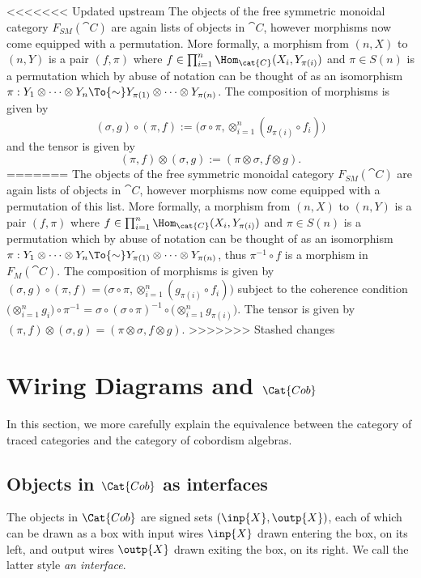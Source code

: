 <<<<<<< Updated upstream
The objects of the free symmetric monoidal category $F_{SM}(\cat{C})$ are again lists of objects in $\cat{C}$, however morphisms now come equipped with a permutation.  More formally, a morphism from $(n,X)$ to $(n,Y)$ is a pair $(f,\pi)$ where $f\in\prod_{i=1}^n\Hom_{\cat{C}}(X_i,Y_{\pi(i)})$ and $\pi\in S(n)$ is a permutation which by abuse of notation can be thought of as an isomorphism $\pi:Y_1\otimes\cdots\otimes Y_n\To{\sim} Y_{\pi(1)}\otimes\cdots\otimes Y_{\pi(n)}$.  The composition of morphisms is given by 
$$(\sigma,g)\circ(\pi,f):=\Big(\sigma\circ\pi,\otimes_{i=1}^n (g_{\pi(i)}\circ f_i)\Big)$$ 
and the tensor is given by 
$$(\pi,f)\otimes(\sigma,g):=(\pi\otimes\sigma,f\otimes g).$$  
=======
The objects of the free symmetric monoidal category $F_{SM}(\cat{C})$ are again lists of objects in $\cat{C}$, however morphisms now come equipped with a permutation of this list.  More formally, a morphism from $(n,X)$ to $(n,Y)$ is a pair $(f,\pi)$ where $f\in\prod_{i=1}^n\Hom_{\cat{C}}(X_i,Y_{\pi(i)})$ and $\pi\in S(n)$ is a permutation which by abuse of notation can be thought of as an isomorphism $\pi:Y_1\otimes\cdots\otimes Y_n\To{\sim} Y_{\pi(1)}\otimes\cdots\otimes Y_{\pi(n)}$, thus $\pi^{-1}\circ f$ is a morphism in $F_M(\cat{C})$.  The composition of morphisms is given by $(\sigma,g)\circ(\pi,f)=\Big(\sigma\circ\pi,\otimes_{i=1}^n (g_{\pi(i)}\circ f_i)\Big)$ subject to the coherence condition $\Big(\otimes_{i=1}^n g_i\Big)\circ\pi^{-1}=\sigma\circ(\sigma\circ\pi)^{-1}\circ\Big(\otimes_{i=1}^n g_{\pi(i)}\Big)$.  The tensor is given by $(\pi,f)\otimes(\sigma,g)=(\pi\otimes\sigma,f\otimes g)$.  
>>>>>>> Stashed changes

\section{Wiring Diagrams and $\Cat{Cob}$}\label{sec:wds and cob}

In this section, we more carefully explain the equivalence between the category of traced categories and the category of cobordism algebras.

\subsection{Objects in $\Cat{Cob}$ as interfaces}

The objects in $\Cat{Cob}$ are signed sets $(\inp{X},\outp{X})$, each of which can be drawn as a box with input wires $\inp{X}$ drawn entering the box, on its left, and output wires $\outp{X}$ drawn exiting the box, on its right. We call the latter style \emph{an interface}.

